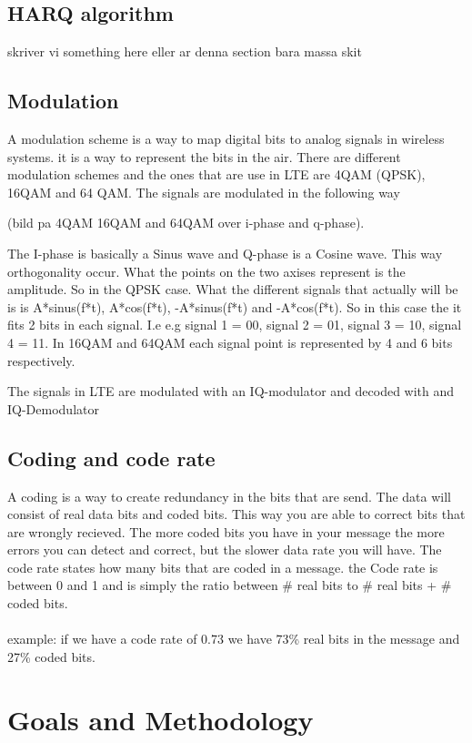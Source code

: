 \documentclass[cropmarks, frame, english]{idamasterthesis}
\begin{document}
\subsection{HARQ algorithm}
skriver vi something here eller ar denna section bara massa skit

\subsection{Modulation}
A modulation scheme is a way to map digital bits to analog signals in wireless systems. it is a way to represent the bits in the air.
There are different modulation schemes and the ones that are use in LTE are 4QAM (QPSK), 16QAM and 64 QAM. The signals are modulated in the following way 

(bild pa 4QAM 16QAM and 64QAM over i-phase and q-phase). 
 
The I-phase is basically a Sinus wave and Q-phase is a Cosine wave. This way orthogonality occur. What the points on the two axises represent is the amplitude. So in the QPSK case. What the different signals that actually will be is
is A*sinus(f*t), A*cos(f*t), -A*sinus(f*t) and -A*cos(f*t). So in this case the it fits 2 bits in each signal. I.e e.g signal 1 = 00, signal 2 = 01, signal 3 = 10, signal 4 = 11. In 16QAM and 64QAM each signal point is represented by 4 and 6 bits respectively.

The signals in LTE are modulated with an IQ-modulator and decoded with and IQ-Demodulator

\subsection{Coding and code rate}
A coding is a way to create redundancy in the bits that are send. The data will consist of real data bits and coded bits. This way you are able to correct bits that are wrongly recieved. The more coded bits you have in your message the more errors you can detect and correct, but the slower data rate you will have. The code rate states how many bits that are coded in a message. the Code rate is between 0 and 1 and is simply the ratio between \# real bits to \# real bits + \# coded bits. 
\\ \\
example: if we have a code rate of 0.73 we have 73\% real bits in the message and 27\% coded bits. 


\section{Goals and Methodology}
\end{document}
